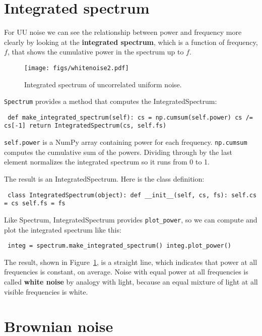 \documentclass[12pt]{book} \usepackage[width=5.5in,height=8.5in, hmarginratio=3:2,vmarginratio=1:1]{geometry}
\begin{document}
\section{Integrated spectrum} 

For UU noise we can see the relationship between power and frequency more clearly by looking at the {\bf integrated spectrum}, which is a function of frequency, $f$, that shows the cumulative power in the spectrum up to $f$. 

\begin{figure} 

\centerline{\texttt{[image: figs/whitenoise2.pdf]}} \caption{Integrated spectrum of uncorrelated uniform noise.} \label{fig.whitenoise2} \end{figure} 

{\tt Spectrum} provides a method that computes the IntegratedSpectrum: 

\begin{verbatim} def make_integrated_spectrum(self): cs = np.cumsum(self.power) cs /= cs[-1] return IntegratedSpectrum(cs, self.fs) \end{verbatim} 

{\tt self.power} is a NumPy array containing power for each frequency. {\tt np.cumsum} computes the cumulative sum of the powers. Dividing through by the last element normalizes the integrated spectrum so it runs from 0 to 1. 

The result is an IntegratedSpectrum. Here is the class definition: 

\begin{verbatim} class IntegratedSpectrum(object): def __init__(self, cs, fs): self.cs = cs self.fs = fs \end{verbatim} 

Like Spectrum, IntegratedSpectrum provides \verb"plot_power", so we can compute and plot the integrated spectrum like this: 

\begin{verbatim} integ = spectrum.make_integrated_spectrum() integ.plot_power() \end{verbatim} 

The result, shown in Figure~\ref{fig.whitenoise2}, is a straight line, which indicates that power at all frequencies is constant, on average. Noise with equal power at all frequencies is called {\bf white noise} by analogy with light, because an equal mixture of light at all visible frequencies is white. 

\section{Brownian noise} \label{brownian} 
\end{document}
